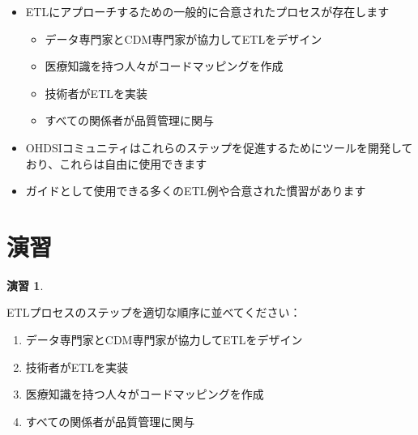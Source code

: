 \documentclass[
  11pt]{book}
\makeatletter
\providecommand{\tightlist}{%
  \setlength{\itemsep}{0pt}\setlength{\parskip}{0pt}}
\newenvironment{kframe}{%
\medskip{}
\setlength{\fboxsep}{.8em}
 \def\at@end@of@kframe{}%
 \ifinner\ifhmode%
  \def\at@end@of@kframe{\end{minipage}}%
  \begin{minipage}{\columnwidth}%
 \fi\fi%
 \def\FrameCommand##1{\hskip\@totalleftmargin \hskip-\fboxsep
 \colorbox{myShadeColor}{##1}\hskip-\fboxsep
     \hskip-\linewidth \hskip-\@totalleftmargin \hskip\columnwidth}%
 \MakeFramed {\advance\hsize-\width
   \@totalleftmargin\z@ \linewidth\hsize
   \@setminipage}}%
 {\par\unskip\endMakeFramed%
 \at@end@of@kframe}
\newenvironment{rmdblock}[1]
  {
  \begin{itemize}
  \renewcommand{\labelitemi}{
    \raisebox{-.7\height}[0pt][0pt]{
      {\setkeys{Gin}{width=3em,keepaspectratio}\texttt{[image: images/\#1]}}
    }
  }
  \setlength{\fboxsep}{1em}
  \begin{kframe}
  \item
  }
  {
  \end{kframe}
  \end{itemize}
  }
\newenvironment{rmdsummary}
  {\begin{rmdblock}{summary}}
  {\end{rmdblock}}
\theoremstyle{definition}
\theoremstyle{definition}
\theoremstyle{definition}
\newtheorem{exercise}{演習}[chapter]
\theoremstyle{definition}
\theoremstyle{remark}
\makeatother
\begin{document}
\begin{rmdsummary}
\begin{itemize}
\item
  ETLにアプローチするための一般的に合意されたプロセスが存在します

  \begin{itemize}
  \tightlist
  \item
    データ専門家とCDM専門家が協力してETLをデザイン
  \item
    医療知識を持つ人々がコードマッピングを作成
  \item
    技術者がETLを実装
  \item
    すべての関係者が品質管理に関与
  \end{itemize}
\item
  OHDSIコミュニティはこれらのステップを促進するためにツールを開発しており、これらは自由に使用できます
\item
  ガイドとして使用できる多くのETL例や合意された慣習があります
\end{itemize}
\end{rmdsummary}

\section{演習}\label{ux6f14ux7fd2-1}

\begin{exercise}
\protect\hypertarget{exr:exerciseEtl1}{}\label{exr:exerciseEtl1}

ETLプロセスのステップを適切な順序に並べてください：

\begin{enumerate}
\def\labelenumi{\Alph{enumi})}
\tightlist
\item
  データ専門家とCDM専門家が協力してETLをデザイン
\item
  技術者がETLを実装
\item
  医療知識を持つ人々がコードマッピングを作成
\item
  すべての関係者が品質管理に関与
\end{enumerate}

\end{exercise}
\end{document}
